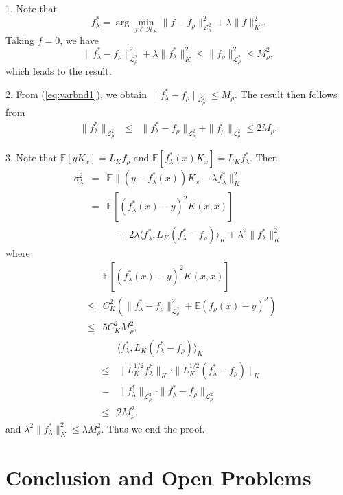 \documentclass[twoside,twocolumn,journal]{IEEEtran}
\newenvironment{pf}[1][Proof]{\medskip\noindent\hspace{1em}{\itshape #1: }}{\hspace*{\fill}~\QED\par\endtrivlist\medskip}
\def\E{{\mathbb E}}        %
\def\<{{\langle}}
\def\>{{\rangle}}
\def\L{{\mathscr L}}
\def\H{{\mathscr H}}
\begin{document}
\begin{pf}
1. Note that
\[ f^\ast_\lambda = \arg \min_{f\in \H_K} \|f - f_\rho\|_{\L^2_\rho}^2 + \lambda \|f\|^2_K. \]
Taking $f=0$, we have
\begin{equation} \label{eq:varbnd1}
\|f^\ast_\lambda - f_\rho\|_{\L^2_\rho}^2 + \lambda \|f^\ast_\lambda\|^2_K \leq \|f_\rho\|_{\L^2_\rho}^2 \leq M_\rho^2, 
\end{equation}
which leads to the result.

2. From (\ref{eq:varbnd1}), we obtain $\|f^\ast_\lambda - f_\rho\|_{\L^2_\rho} \leq M_\rho$. The result then follows from
\begin{eqnarray*}
\|f_\lambda^\ast\|_{\L^2_\rho} & \leq & \| f_\lambda^\ast - f_\rho \|_{\L^2_\rho} + \|f_\rho \|_{\L^2_\rho} \leq 2M_\rho. 
\end{eqnarray*}

3. Note that $\E[yK_x]=L_K f_\rho$ and $\E[f^\ast_\lambda(x)K_x]=L_K f^\ast_\lambda$. Then
\begin{eqnarray*}
\sigma_\lambda^2 & = & \E\|(y-f^\ast_\lambda(x))K_x-\lambda f^\ast_\lambda\|_K^2 \\
& = & \E [(f^\ast_\lambda(x)-y)^2 K(x,x)] \\
& & \ \ \ \ \ + 2 \lambda \<f^\ast_\lambda, L_K (f^\ast_\lambda-f_\rho)\>_K + \lambda^2 \|f^\ast_\lambda\|_K^2 
\end{eqnarray*}
where
\begin{eqnarray*}
& & \E[(f^\ast_\lambda(x)-y)^2 K(x,x)] \\
& \leq & C^2_K (\|f^\ast_\lambda-f_\rho\|^2_{\L^2_\rho}+ \E(f_\rho(x)-y)^2 )\\
& \leq & 5 C_K^2 M^2_\rho,
\end{eqnarray*}
\begin{eqnarray*}
& & \<f^\ast_\lambda, L_K (f^\ast_\lambda-f_\rho)\>_K \\
& \leq & \|L_K^{1/2} f^\ast_\lambda\|_K \cdot \| L_K^{1/2} (f^\ast_\lambda-f_\rho)\|_K \\
& = & \|f^\ast_\lambda\|_{\L^2_\rho} \cdot \|f^\ast_\lambda-f_\rho\|_{\L^2_\rho} \\
& \leq & 2 M_\rho^2 ,
\end{eqnarray*}
and $\lambda^2 \|f^\ast_\lambda\|^2_K \leq \lambda M^2_\rho$.
Thus we end the proof.
\end{pf}

\section{Conclusion and Open Problems}
\end{document}
